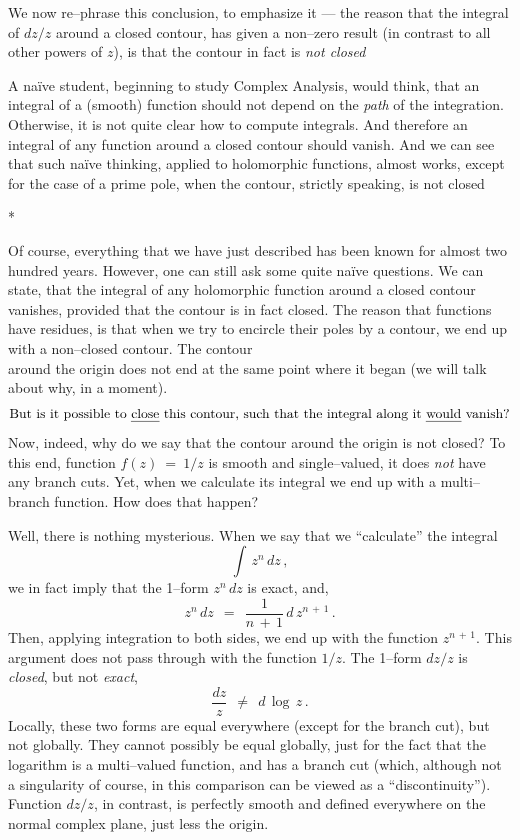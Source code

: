 \documentclass[epsfig,12pt]{article}
\begin{document}
	We now re--phrase this conclusion, to emphasize it --- the reason that the integral of $ dz / z $ around a closed contour,
	has given a non--zero result (in contrast to all other powers of $ z $), is that the contour in fact is \emph{not closed}

	A na\"ive student, beginning to study Complex Analysis, would think, that an integral of a (smooth) function should not depend on the \emph{path} of the integration.
	Otherwise, it is not quite clear how to compute integrals.
	And therefore an integral of any function around a closed contour should vanish.
	And we can see that such na\"ive thinking, applied to holomorphic functions, almost works, except for the case of a prime pole, when the contour, strictly speaking,
	is not closed


\vskip 0.8cm
\centerline{*\qquad\qquad\qquad*\qquad\qquad\qquad*}
\vskip 0.6cm


	Of course, everything that we have just described has been known for almost two hundred years.
	However, one can still ask some quite na\"ive questions.
	We can state, that the integral of any holomorphic function around a closed contour vanishes,
	provided that the contour is in fact closed.
	The reason that functions have residues, is that when we try to encircle their poles by a contour,
	we end up with a non--closed contour.
	The contour
\[
\]
	around the origin does not end at the same point where it began (we will talk about why, in a moment).
\[
	\text{But is it possible to \emph{close} this contour, such that the integral along it \emph{would} vanish?}
\]
	Now, indeed, why do we say that the contour around the origin is not closed?
	To this end, function $ f(z) ~=~ 1 / z $ is smooth and single--valued, it does \emph{not} have any branch cuts.
	Yet, when we calculate its integral we end up with a multi--branch function.
	How does that happen?

	Well, there is nothing mysterious.
	When we say that we ``calculate'' the integral
\[	
	\int\, z^n\, dz\,,
\]
	we in fact imply that the 1--form $ z^{n}\,dz $ is exact, and,
\[
	z^n\,dz	~~=~~	\frac{1}{n \,+\, 1}\, d\,z^{n \,+\, 1}\,.
\]
	Then, applying integration to both sides, we end up with the function $ z^{n \,+\, 1} $.
	This argument does not pass through with the function $ 1 / z $.
	The 1--form $ dz/z $ is \emph{closed}, but not \emph{exact},
\[
	\frac{dz}{z}	~~\neq~~	d\,\log\,z\,.
\]
	Locally, these two forms are equal everywhere (except for the branch cut), but not globally.
	They cannot possibly be equal globally, just for the fact that the logarithm is a multi--valued function,
	and has a branch cut (which, although not a singularity of course, in this comparison can be viewed as a ``discontinuity'').
	Function $ dz / z $, in contrast, is perfectly smooth and defined everywhere on the normal complex plane, 
	just less the origin.
\end{document}
